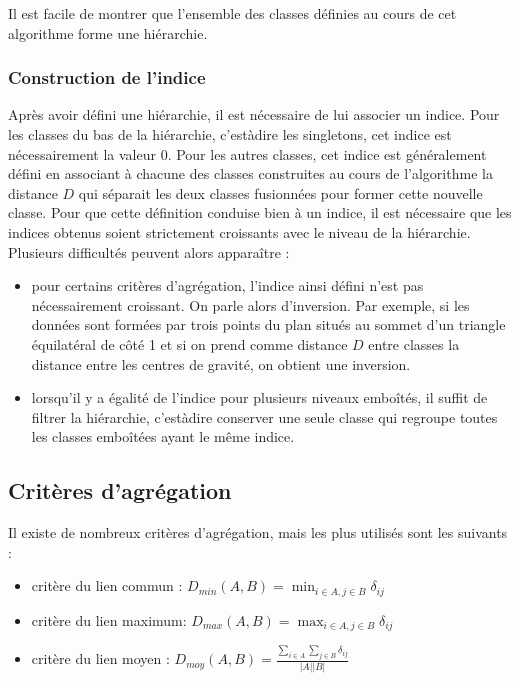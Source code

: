 \documentclass[letterpaper,10pt,english]{jupyterBook}
\begin{document}
\sphinxAtStartPar
Il est facile de montrer que l’ensemble des classes définies au cours de cet algorithme forme une hiérarchie.


\subsubsection{Construction de l’indice}
\label{\detokenize{clustering:construction-de-l-indice}}
\sphinxAtStartPar
Après avoir défini une hiérarchie, il est nécessaire de lui associer un indice. Pour les classes du bas de la hiérarchie, c’est\sphinxhyphen{}à\sphinxhyphen{}dire les singletons, cet indice est nécessairement la valeur 0. Pour les autres classes, cet indice est généralement
défini en associant à chacune des classes construites au cours de l’algorithme la distance \(D\) qui séparait les deux classes fusionnées pour former cette nouvelle classe. Pour que cette définition conduise bien à un indice, il est nécessaire que
les indices obtenus soient strictement croissants avec le niveau de la hiérarchie. Plusieurs difficultés peuvent alors apparaître :
\begin{itemize}
\item {} 
\sphinxAtStartPar
pour certains critères d’agrégation, l’indice ainsi défini n’est pas nécessairement croissant. On parle alors d’inversion. Par exemple, si les données sont formées par trois points du plan situés au sommet d’un triangle équilatéral de côté 1 et si on prend comme distance \(D\) entre classes la distance entre les centres de gravité, on obtient une inversion.

\item {} 
\sphinxAtStartPar
lorsqu’il y a égalité de l’indice pour plusieurs niveaux emboîtés, il suffit de filtrer la hiérarchie, c’est\sphinxhyphen{}à\sphinxhyphen{}dire conserver une seule classe qui regroupe toutes les classes emboîtées ayant le même indice.

\end{itemize}


\subsection{Critères d’agrégation}
\label{\detokenize{clustering:criteres-d-agregation}}
\sphinxAtStartPar
Il existe de nombreux critères d’agrégation, mais les plus utilisés sont les suivants :
\begin{itemize}
\item {} 
\sphinxAtStartPar
critère du lien commun : \(D_{min}(A,B)=\displaystyle\min_{i\in A,j\in B}\delta_{ij}\)

\item {} 
\sphinxAtStartPar
critère du lien maximum: \(D_{max}(A,B)=\displaystyle\max_{i\in A,j\in B}\delta_{ij}\)

\item {} 
\sphinxAtStartPar
critère du lien moyen : \(D_{moy}(A,B)=\frac{\displaystyle\sum_{i\in A}\displaystyle\sum_{j\in B}\delta_{ij}}{|A||B|}\)

\end{itemize}
\end{document}
